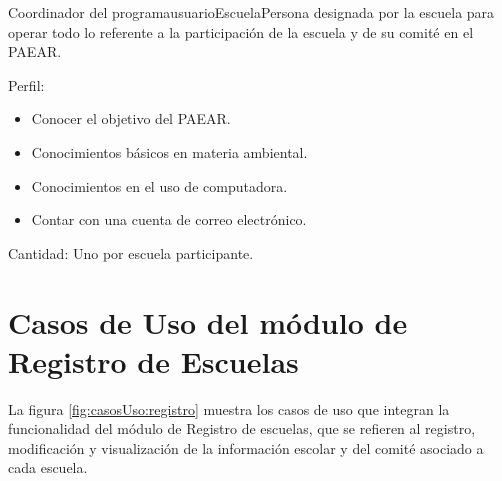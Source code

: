 \begin{actor}{Coordinador del programa}{usuarioEscuela}{Persona designada por la escuela para operar todo lo referente a la participación de la escuela y de su comité en el PAEAR.}
	\item[Perfil:] \hspace{1pt}
		\begin{itemize}
		    \item Conocer el objetivo del PAEAR.
		    \item Conocimientos básicos en materia ambiental.
		    \item Conocimientos en el uso de computadora.
		    \item Contar con una cuenta de correo electrónico.
	    \end{itemize}

	\item[Cantidad:] Uno por escuela participante.

\end{actor}



\section{Casos de Uso del módulo de Registro de Escuelas}

    La figura \ref{fig:casosUso:registro} muestra los casos de uso que integran la funcionalidad del módulo de Registro de escuelas, que se refieren al registro, modificación y visualización de la información escolar y del comité asociado a cada escuela.
%
